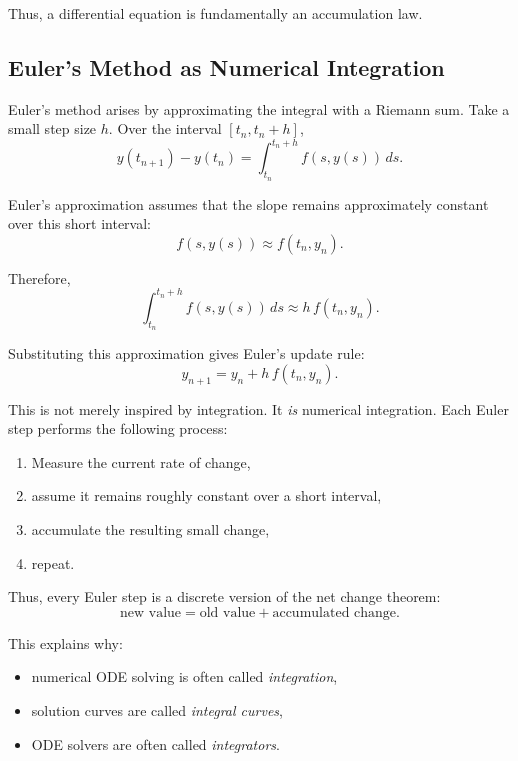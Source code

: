 Thus, a differential equation is fundamentally an accumulation law.

\subsection{Euler's Method as Numerical Integration}

Euler's method arises by approximating the integral with a Riemann sum. Take a small step size \(h\). Over the interval \([t_{n},t_{n}+h]\),
\[ y(t_{n+1})-y(t_{n}) = \int_{t_{n}}^{t_{n}+h}f(s,y(s))\,ds. \]

Euler's approximation assumes that the slope remains approximately constant over this short interval:
\[ f(s,y(s)) \approx f(t_{n},y_{n}). \]

Therefore,
\[ \int_{t_{n}}^{t_{n}+h}f(s,y(s))\,ds \approx h\,f(t_{n},y_{n}). \]

Substituting this approximation gives Euler's update rule:
\[ y_{n+1}=y_{n}+h\,f(t_{n},y_{n}). \]

This is not merely inspired by integration. It \emph{is} numerical integration. Each Euler step performs the following process:

\begin{enumerate}
  \item Measure the current rate of change,
  \item assume it remains roughly constant over a short interval,
  \item accumulate the resulting small change,
  \item repeat.
\end{enumerate}

Thus, every Euler step is a discrete version of the net change theorem:
\[ \text{new value}= \text{old value}+ \text{accumulated change}. \]

This explains why:

\begin{itemize}
  \item numerical ODE solving is often called \emph{integration},
  \item solution curves are called \emph{integral curves},
  \item ODE solvers are often called \emph{integrators}.
\end{itemize}
